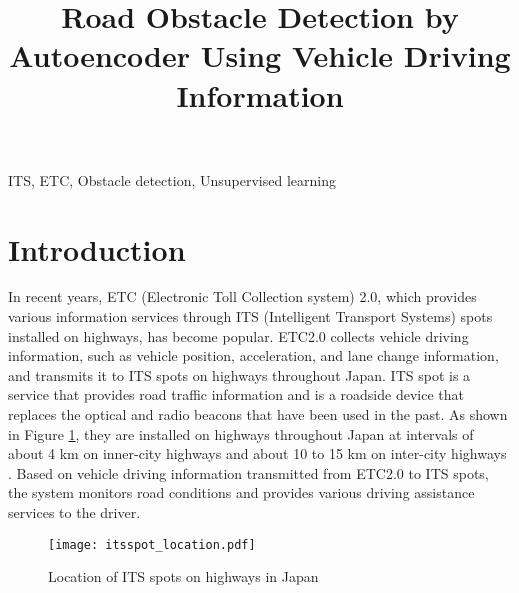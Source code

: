 \documentclass[paper]{ieice}
\title[Road Obstacle Detection by Autoencoder]{Road Obstacle Detection by Autoencoder Using Vehicle Driving Information}
\begin{document}
\maketitle

\begin{summary}

\end{summary}
\begin{keywords}
  ITS, ETC, Obstacle detection, Unsupervised learning
\end{keywords}

\section{Introduction}
\label{sec:introduction}
%
In recent years, ETC (Electronic Toll Collection system) 2.0, which provides various information services through ITS (Intelligent Transport Systems) spots installed on highways, has become popular.
%
ETC2.0 collects vehicle driving information, such as vehicle position, acceleration, and lane change information, and transmits it to ITS spots on highways throughout Japan.
%
ITS spot is a service that provides road traffic information and is a roadside device that replaces the optical and radio beacons that have been used in the past\cite{itsspot}.
%
As shown in Figure \ref{fig:itsspot_location}, they are installed on highways throughout Japan at intervals of about 4 km on inner-city highways and about 10 to 15 km on inter-city highways \cite{etc2.0Location}.
%
Based on vehicle driving information transmitted from ETC2.0 to ITS spots, the system monitors road conditions and provides various driving assistance services to the driver.
%
\begin{figure}[tb]
  \begin{center}
    \texttt{[image: itsspot\_location.pdf]}
  \end{center}
  \caption{Location of ITS spots on highways in Japan}
  \label{fig:itsspot_location}
\end{figure}
\end{document}
